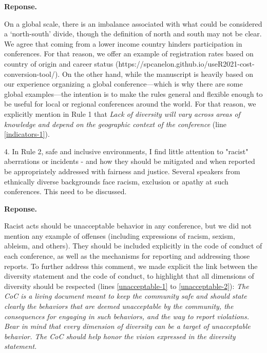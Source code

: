 \documentclass{article}
\newenvironment{Reply}{\noindent\color{BlueViolet}\textbf{Reponse.}}{\vspace{1em}}
\begin{document}
\begin{Reply}

   On a global scale, there is an imbalance associated with what could be considered a `north-south' divide, though the definition of north and south may not be clear. We agree that coming from a lower income country hinders participation in conferences. For that reason, we offer an example of registration rates based on country of origin and career status (https://spcanelon.github.io/useR2021-cost-conversion-tool/). 
   On the other hand, while the manuscript is heavily based on our experience organizing a global conference—which is why there are some global examples—the intention is to make the rules general and flexible enough to be useful for local or regional conferences around the world. 
   For that reason, we explicitly mention in Rule 1 that \textit{Lack of diversity will vary across areas of knowledge and depend on the geographic context of the conference} (line \ref{indicators-1}). 

\end{Reply}

4. In Rule 2, safe and inclusive environments, I find little attention to "racist" aberrations or incidents - and how they should be mitigated and when reported be appropriately addressed with fairness and justice.
Several speakers from ethnically diverse backgrounds face racism, exclusion or apathy at such conferences. This need to be discussed.

\begin{Reply}

    Racist acts should be unacceptable behavior in any conference, but we did not mention any example of offenses (including expressions of racism, sexism, ableism, and others). They should be included explicitly in the code of conduct of each conference, as well as the mechanisms for reporting and addressing those reports.
    To further address this comment, we made explicit the link between the diversity statement and the code of conduct, to highlight that all dimensions of diversity should be respected (lines \ref{unacceptable-1} to \ref{unacceptable-2}):
    \textit{The CoC is a living document meant to keep the community safe and should state clearly the behaviors that are deemed unacceptable by the community, the consequences for engaging in such behaviors, and the way to report violations. Bear in mind that every dimension of diversity can be a target of unacceptable behavior. The CoC should help honor the vision expressed in the diversity statement.}
\end{Reply}
\end{document}
